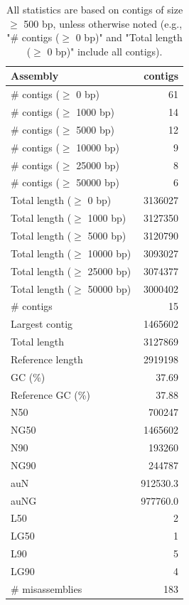 \documentclass[12pt,a4paper]{article}
\begin{document}
\begin{table}[ht]
\begin{center}
\caption{All statistics are based on contigs of size $\geq$ 500 bp, unless otherwise noted (e.g., "\# contigs ($\geq$ 0 bp)" and "Total length ($\geq$ 0 bp)" include all contigs).}
\begin{tabular}{|l*{1}{|r}|}
\hline
Assembly & contigs \\ \hline
\# contigs ($\geq$ 0 bp) & 61 \\ \hline
\# contigs ($\geq$ 1000 bp) & 14 \\ \hline
\# contigs ($\geq$ 5000 bp) & 12 \\ \hline
\# contigs ($\geq$ 10000 bp) & 9 \\ \hline
\# contigs ($\geq$ 25000 bp) & 8 \\ \hline
\# contigs ($\geq$ 50000 bp) & 6 \\ \hline
Total length ($\geq$ 0 bp) & 3136027 \\ \hline
Total length ($\geq$ 1000 bp) & 3127350 \\ \hline
Total length ($\geq$ 5000 bp) & 3120790 \\ \hline
Total length ($\geq$ 10000 bp) & 3093027 \\ \hline
Total length ($\geq$ 25000 bp) & 3074377 \\ \hline
Total length ($\geq$ 50000 bp) & 3000402 \\ \hline
\# contigs & 15 \\ \hline
Largest contig & 1465602 \\ \hline
Total length & 3127869 \\ \hline
Reference length & 2919198 \\ \hline
GC (\%) & 37.69 \\ \hline
Reference GC (\%) & 37.88 \\ \hline
N50 & 700247 \\ \hline
NG50 & 1465602 \\ \hline
N90 & 193260 \\ \hline
NG90 & 244787 \\ \hline
auN & 912530.3 \\ \hline
auNG & 977760.0 \\ \hline
L50 & 2 \\ \hline
LG50 & 1 \\ \hline
L90 & 5 \\ \hline
LG90 & 4 \\ \hline
\# misassemblies & 183 \\ \hline

\end{tabular}
\end{center}
\end{table}
\end{document}

